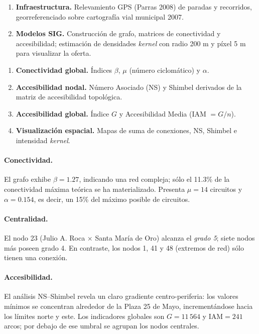 \documentclass[11pt]{article}
\begin{document}
		\begin{enumerate}
		  \item \textbf{Infraestructura.} Relevamiento GPS (Parras 2008) de paradas y recorridos, georreferenciado sobre cartografía vial municipal 2007.
		  \item \textbf{Modelos SIG.} Construcción de grafo, matrices de conectividad y accesibilidad; estimación de densidades \emph{kernel} con radio 200 m y píxel 5 m para visualizar la oferta.
		\end{enumerate}

		\begin{enumerate}
		  \item \textbf{Conectividad global.} Índices $\beta$, $\mu$ (número ciclomático) y $\alpha$.
		  \item \textbf{Accesibilidad nodal.} Número Asociado (NS) y Shimbel derivados de la matriz de accesibilidad topológica.
		  \item \textbf{Accesibilidad global.} Índice $G$ y Accesibilidad Media (IAM $=G/n$).
		  \item \textbf{Visualización espacial.} Mapas de suma de conexiones, NS, Shimbel e intensidad \emph{kernel}.
		\end{enumerate}

		\paragraph{Conectividad.}
		El grafo exhibe $\beta = 1.27$, indicando una red compleja; sólo el 11.3\% de la conectividad máxima teórica se ha materializado. Presenta $\mu = 14$ circuitos y $\alpha = 0.154$, es decir, un 15\% del máximo posible de circuitos.

		\paragraph{Centralidad.}
		El nodo 23 (Julio A. Roca × Santa María de Oro) alcanza el \emph{grado 5}; siete nodos más poseen grado 4. En contraste, los nodos 1, 41 y 48 (extremos de red) sólo tienen una conexión.

		\paragraph{Accesibilidad.}
		El análisis NS–Shimbel revela un claro gradiente centro-periferia: los valores mínimos se concentran alrededor de la Plaza 25 de Mayo, incrementándose hacia los límites norte y este. Los indicadores globales son $G = 11\,564$ y $\mathrm{IAM}=241$ arcos; por debajo de ese umbral se agrupan los nodos centrales.
\end{document}
